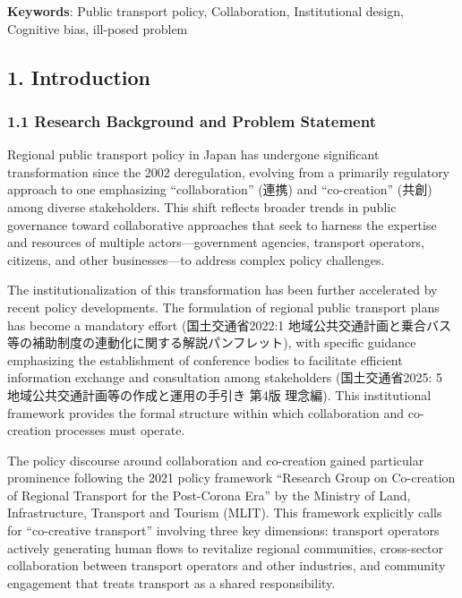 \textbf{Keywords}: Public transport policy, Collaboration, Institutional design, Cognitive bias, ill-posed problem

\subsection{1. Introduction}\label{introduction}

\subsubsection{1.1 Research Background and Problem Statement}\label{research-background-and-problem-statement}

Regional public transport policy in Japan has undergone significant transformation since the 2002 deregulation, evolving from a primarily regulatory approach to one emphasizing ``collaboration'' (連携) and ``co-creation'' (共創) among diverse stakeholders. This shift reflects broader trends in public governance toward collaborative approaches that seek to harness the expertise and resources of multiple actors---government agencies, transport operators, citizens, and other businesses---to address complex policy challenges.

The institutionalization of this transformation has been further accelerated by recent policy developments. The formulation of regional public transport plans has become a mandatory effort (国土交通省2022:1 地域公共交通計画と乗合バス等の補助制度の連動化に関する解説パンフレット), with specific guidance emphasizing the establishment of conference bodies to facilitate efficient information exchange and consultation among stakeholders (国土交通省2025: 5 地域公共交通計画等の作成と運用の手引き 第4版 理念編). This institutional framework provides the formal structure within which collaboration and co-creation processes must operate.

The policy discourse around collaboration and co-creation gained particular prominence following the 2021 policy framework ``Research Group on Co-creation of Regional Transport for the Post-Corona Era'' by the Ministry of Land, Infrastructure, Transport and Tourism (MLIT). This framework explicitly calls for ``co-creative transport'' involving three key dimensions: transport operators actively generating human flows to revitalize regional communities, cross-sector collaboration between transport operators and other industries, and community engagement that treats transport as a shared responsibility.

